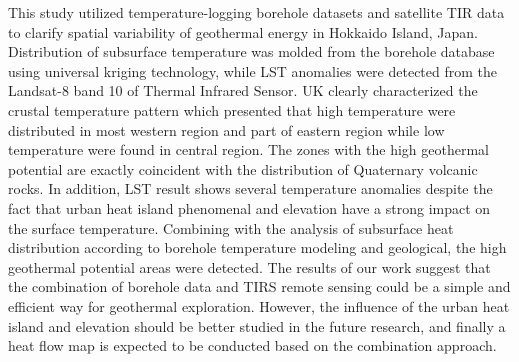 
This study utilized temperature-logging borehole datasets and satellite TIR data to clarify spatial variability of geothermal energy in Hokkaido Island, Japan. Distribution of subsurface temperature was molded from the borehole database using universal kriging technology, while LST anomalies were detected from the Landsat-8 band 10 of Thermal Infrared Sensor. UK clearly characterized the crustal temperature pattern which presented that high temperature were distributed in most western region and part of eastern region while low temperature were found in central region. The zones with the high geothermal potential are exactly coincident with the distribution of Quaternary volcanic rocks. In addition, LST result shows several temperature anomalies despite the fact that urban heat island phenomenal and elevation have a strong impact on the surface temperature. Combining with the analysis of subsurface heat distribution according to borehole temperature modeling and geological, the high geothermal potential areas were detected. The results of our work suggest that the combination of borehole data and TIRS remote sensing could be a simple and efficient way for geothermal exploration. However, the influence of the urban heat island and elevation should be better studied in the future research, and finally a heat flow map is expected to be conducted based on the combination approach.

